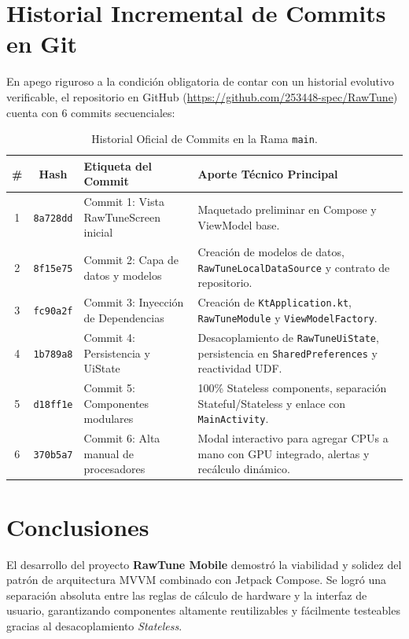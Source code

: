 \documentclass[12pt,a4paper]{article}
\begin{document}
\section{Historial Incremental de Commits en Git}

En apego riguroso a la condición obligatoria de contar con un historial evolutivo verificable, el repositorio en GitHub (\url{https://github.com/253448-spec/RawTune}) cuenta con 6 commits secuenciales:

\begin{table}[H]
\centering
\small
\begin{tabular}{@{}cclp{7.5cm}@{}}
\toprule
\textbf{\#} & \textbf{Hash} & \textbf{Etiqueta del Commit} & \textbf{Aporte Técnico Principal} \\ \midrule
1 & \texttt{8a728dd} & Commit 1: Vista RawTuneScreen inicial & Maquetado preliminar en Compose y ViewModel base. \\
2 & \texttt{8f15e75} & Commit 2: Capa de datos y modelos & Creación de modelos de datos, \texttt{RawTuneLocalDataSource} y contrato de repositorio. \\
3 & \texttt{fc90a2f} & Commit 3: Inyección de Dependencias & Creación de \texttt{KtApplication.kt}, \texttt{RawTuneModule} y \texttt{ViewModelFactory}. \\
4 & \texttt{1b789a8} & Commit 4: Persistencia y UiState & Desacoplamiento de \texttt{RawTuneUiState}, persistencia en \texttt{SharedPreferences} y reactividad UDF. \\
5 & \texttt{d18ff1e} & Commit 5: Componentes modulares & 100\% Stateless components, separación Stateful/Stateless y enlace con \texttt{MainActivity}. \\
6 & \texttt{370b5a7} & Commit 6: Alta manual de procesadores & Modal interactivo para agregar CPUs a mano con GPU integrado, alertas y recálculo dinámico. \\ \bottomrule
\end{tabular}
\caption{Historial Oficial de Commits en la Rama \texttt{main}.}
\end{table}

\section{Conclusiones}
El desarrollo del proyecto \textbf{RawTune Mobile} demostró la viabilidad y solidez del patrón de arquitectura MVVM combinado con Jetpack Compose. Se logró una separación absoluta entre las reglas de cálculo de hardware y la interfaz de usuario, garantizando componentes altamente reutilizables y fácilmente testeables gracias al desacoplamiento \textit{Stateless}. 
\end{document}
